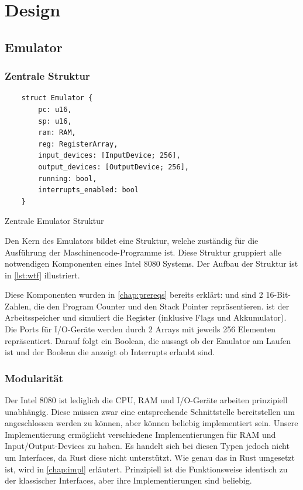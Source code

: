 \chapter{Design}\label{chap:design}

\section{Emulator}

\subsection{Zentrale Struktur}

\begin{listing}[ht]
\begin{verbatim}
    struct Emulator {
        pc: u16,
        sp: u16,
        ram: RAM,
        reg: RegisterArray,
        input_devices: [InputDevice; 256],
        output_devices: [OutputDevice; 256],
        running: bool,
        interrupts_enabled: bool
    }
\end{verbatim}
\centering
\caption{Zentrale Emulator Struktur}
\label{lst:wtf}
\end{listing}

Den Kern des Emulators bildet eine Struktur, welche zuständig für die Ausführung der Maschinencode-Programme ist. Diese Struktur gruppiert alle notwendigen Komponenten eines Intel 8080 Systems. Der Aufbau der Struktur ist in \cref{lst:wtf} illustriert.

Diese Komponenten wurden in \cref{chap:prereqs} bereits erklärt:  und  sind 2 16-Bit-Zahlen, die den Program Counter und den Stack Pointer repräsentieren.  ist der Arbeitsspeicher und  simuliert die Register (inklusive Flags und Akkumulator).
Die Ports für I/O-Geräte werden durch 2 Arrays mit jeweils 256 Elementen repräsentiert.
Darauf folgt ein Boolean, die aussagt ob der Emulator am Laufen ist und der Boolean die anzeigt ob Interrupts erlaubt sind.


\subsection{Modularität}

Der Intel 8080 ist lediglich die CPU, \ac{RAM} und I/O-Geräte arbeiten prinzipiell unabhängig. Diese müssen zwar eine entsprechende Schnittstelle bereitstellen um angeschlossen werden zu können, aber können beliebig implementiert sein. Unsere Implementierung ermöglicht verschiedene Implementierungen für \ac{RAM} und Input/Output-Devices zu haben. Es handelt sich bei diesen Typen jedoch nicht um Interfaces, da Rust diese nicht unterstützt. Wie genau das in Rust umgesetzt ist, wird in \cref{chap:impl} erläutert. Prinzipiell ist die Funktionsweise identisch zu der klassischer Interfaces, aber ihre Implementierungen sind beliebig.

